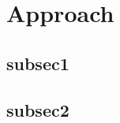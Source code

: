 

\section{Approach}\label{sec_approach}


\subsection{subsec1}


\subsection{subsec2}\label{approach_subsec2}


